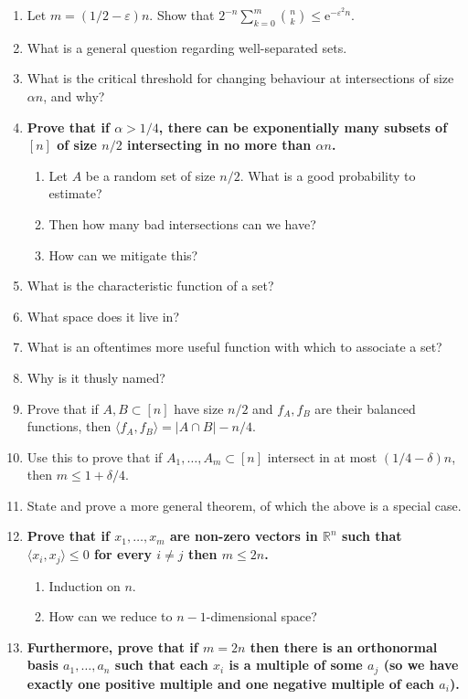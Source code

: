 \documentclass{article}
\renewcommand{\rm}[1]{\mathrm{#1}}
\newcommand{\bb}[1]{\mathbb{#1}}
\newcommand{\e}{\rm{e}}
\newcommand{\eps}{\varepsilon}
\newcommand{\R}{\bb{R}}
\begin{document}
\begin{enumerate}
    \item Let $m = (1/2 - \eps)n$. Show that $2^{-n}\sum_{k=0}^{m}{n\choose k} \le \e^{-\eps^2n}$.
    \item What is a general question regarding well-separated sets.
    \item What is the critical threshold for changing behaviour at intersections of size $\alpha n$, and why?
    \item \textbf{Prove that if $\alpha > 1/4$, there can be exponentially many subsets of $[n]$ of size $n/2$ intersecting in no more than $\alpha n$.}
    \begin{enumerate}
        \item Let $A$ be a random set of size $n/2$. What is a good probability to estimate?
        \item Then how many bad intersections can we have?
        \item How can we mitigate this?
    \end{enumerate}
    \item What is the characteristic function of a set?
    \item What space does it live in?
    \item What is an oftentimes more useful function with which to associate a set?
    \item Why is it thusly named?
    \item Prove that if $A,B\subset [n]$ have size $n/2$ and $f_A,f_B$ are their balanced functions, then $\langle f_A,f_B\rangle = |A\cap B| - n/4$.
    \item Use this to prove that if $A_1,\dots,A_m\subset [n]$ intersect in at most $(1/4 - \delta)n$, then $m \le 1 + \delta/4$.
    \item State and prove a more general theorem, of which the above is a special case.
    \item \textbf{Prove that if $x_1,\dots,x_m$ are non-zero vectors in $\R^n$ such that $\langle x_i,x_j\rangle\le 0$ for every $i\ne j$ then $m\le 2n$.}
    \begin{enumerate}
        \item Induction on $n$.
        \item How can we reduce to $n-1$-dimensional space?
    \end{enumerate}
    \item \textbf{Furthermore, prove that if $m = 2n$ then there is an orthonormal basis $a_1,\dots,a_n$ such that each $x_i$ is a multiple of some $a_j$ (so we have exactly one positive multiple and one negative multiple of each $a_i$).}

\end{enumerate}
\end{document}
